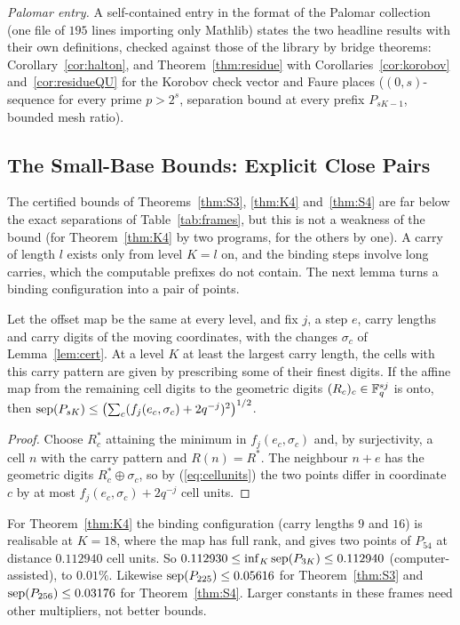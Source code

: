 \emph{Palomar entry.} A self-contained entry in the format of the Palomar collection (one file of $195$ lines importing only Mathlib) states the two headline results with their own definitions, checked against those of the library by bridge theorems: Corollary~\ref{cor:halton}, and Theorem~\ref{thm:residue} with Corollaries~\ref{cor:korobov} and~\ref{cor:residueQU} for the Korobov check vector and Faure places ($(0,s)$-sequence for every prime $p>2^s$, separation bound at every prefix $P_{sK-1}$, bounded mesh ratio).

\subsection{The Small-Base Bounds: Explicit Close Pairs}\label{app:sharp}
The certified bounds of Theorems~\ref{thm:S3}, \ref{thm:K4} and~\ref{thm:S4} are far below the exact separations of Table~\ref{tab:frames}, but this is not a weakness of the bound (for Theorem~\ref{thm:K4} by two programs, for the others by one). A carry of length $l$ exists only from level $K=l$ on, and the binding steps involve long carries, which the computable prefixes do not contain. The next lemma turns a binding configuration into a pair of points.

\begin{lemma}\label{lem:witness}
Let the offset map be the same at every level, and fix $j$, a step $e$, carry lengths and carry digits of the moving coordinates, with the changes $\sigma_c$ of Lemma~\ref{lem:cert}. At a level $K$ at least the largest carry length, the cells with this carry pattern are given by prescribing some of their finest digits. If the affine map from the remaining cell digits to the geometric digits $(R_c)_c\in\mathbb{F}_q^{sj}$ is onto, then $\operatorname{sep}(P_{sK})\le\bigl(\sum_c(f_j(e_c,\sigma_c)+2q^{-j})^2\bigr)^{1/2}$.
\end{lemma}

\begin{proof}
Choose $R^*_c$ attaining the minimum in $f_j(e_c,\sigma_c)$ and, by surjectivity, a cell $n$ with the carry pattern and $R(n)=R^*$. The neighbour $n+e$ has the geometric digits $R^*_c\oplus\sigma_c$, so by (\ref{eq:cellunits}) the two points differ in coordinate $c$ by at most $f_j(e_c,\sigma_c)+2q^{-j}$ cell units.
\end{proof}

For Theorem~\ref{thm:K4} the binding configuration (carry lengths $9$ and $16$) is realisable at $K=18$, where the map has full rank, and gives two points of $P_{54}$ at distance $0.112940$ cell units. So $0.112930\le\inf_K\operatorname{sep}(P_{3K})\le0.112940$ (computer-assisted), to $0.01\%$. Likewise $\operatorname{sep}(P_{225})\le0.05616$ for Theorem~\ref{thm:S3} and $\operatorname{sep}(P_{256})\le0.03176$ for Theorem~\ref{thm:S4}. Larger constants in these frames need other multipliers, not better bounds.

